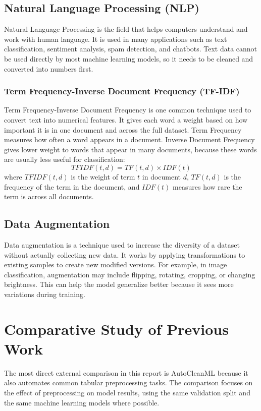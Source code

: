 \documentclass[12pt,a4paper,oneside]{report}
\begin{document}
\subsection{Natural Language Processing (NLP) ~\cite{sabharwal2021introduction}}
\noindent Natural Language Processing is the field that helps computers
understand and work with human language. It is used in many applications such as
text classification, sentiment analysis, spam detection, and chatbots. Text data
cannot be used directly by most machine learning models, so it needs to be
cleaned and converted into numbers first.

\subsubsection{Term Frequency-Inverse Document Frequency (TF-IDF)}
Term Frequency-Inverse Document Frequency is one common technique used
to convert text into numerical features. It gives each word a weight based on
how important it is in one document and across the full dataset. Term Frequency
measures how often a word appears in a document. Inverse Document Frequency gives
lower weight to words that appear in many documents, because these words are
usually less useful for classification:
\[
TFIDF(t,d) = TF(t,d) \times IDF(t)
\]
where $TFIDF(t,d)$ is the weight of term $t$ in document $d$, $TF(t,d)$ is the
frequency of the term in the document, and $IDF(t)$ measures how rare the term
is across all documents.

\subsection{Data Augmentation}
Data augmentation is a technique used to increase the diversity of a dataset
without actually collecting new data. It works by applying transformations to
existing samples to create new modified versions. For example, in image
classification, augmentation may include flipping, rotating, cropping, or
changing brightness. This can help the model generalize better because it sees
more variations during training.

\section{Comparative Study of Previous Work}
The most direct external comparison in this report is AutoCleanML because it also automates common tabular preprocessing tasks. The comparison focuses on the effect of preprocessing on model results, using the same validation split and the same machine learning models where possible.
\end{document}
